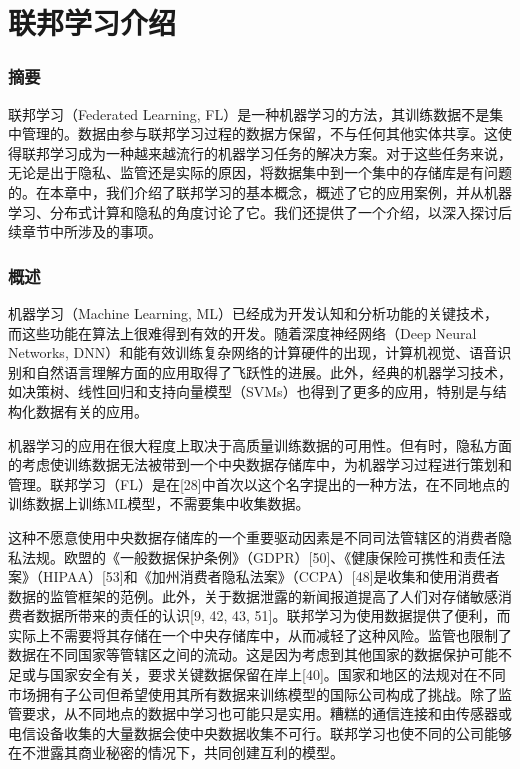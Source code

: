 \chapter{联邦学习介绍}

\subsection{摘要}

联邦学习\cite{mcmahan2017communication}（Federated Learning, FL）是一种机器学习的方法，其训练数据不是集中管理的。数据由参与联邦学习过程的数据方保留，不与任何其他实体共享。这使得联邦学习成为一种越来越流行的机器学习任务的解决方案。对于这些任务来说，无论是出于隐私、监管还是实际的原因，将数据集中到一个集中的存储库是有问题的。在本章中，我们介绍了联邦学习的基本概念，概述了它的应用案例，并从机器学习、分布式计算和隐私的角度讨论了它。我们还提供了一个介绍，以深入探讨后续章节中所涉及的事项。

\subsection{概述}

机器学习（Machine Learning, ML）已经成为开发认知和分析功能的关键技术，而这些功能在算法上很难得到有效的开发。随着深度神经网络（Deep Neural Networks, DNN）和能有效训练复杂网络的计算硬件的出现，计算机视觉、语音识别和自然语言理解方面的应用取得了飞跃性的进展。此外，经典的机器学习技术，如决策树、线性回归和支持向量模型（SVMs）也得到了更多的应用，特别是与结构化数据有关的应用。

机器学习的应用在很大程度上取决于高质量训练数据的可用性。但有时，隐私方面的考虑使训练数据无法被带到一个中央数据存储库中，为机器学习过程进行策划和管理。联邦学习（FL）是在[28]中首次以这个名字提出的一种方法，在不同地点的训练数据上训练ML模型，不需要集中收集数据。

这种不愿意使用中央数据存储库的一个重要驱动因素是不同司法管辖区的消费者隐私法规。欧盟的《一般数据保护条例》（GDPR）[50]、《健康保险可携性和责任法案》（HIPAA）[53]和《加州消费者隐私法案》（CCPA）[48]是收集和使用消费者数据的监管框架的范例。此外，关于数据泄露的新闻报道提高了人们对存储敏感消费者数据所带来的责任的认识[9, 42, 43, 51]。联邦学习为使用数据提供了便利，而实际上不需要将其存储在一个中央存储库中，从而减轻了这种风险。监管也限制了数据在不同国家等管辖区之间的流动。这是因为考虑到其他国家的数据保护可能不足或与国家安全有关，要求关键数据保留在岸上[40]。国家和地区的法规对在不同市场拥有子公司但希望使用其所有数据来训练模型的国际公司构成了挑战。除了监管要求，从不同地点的数据中学习也可能只是实用。糟糕的通信连接和由传感器或电信设备收集的大量数据会使中央数据收集不可行。联邦学习也使不同的公司能够在不泄露其商业秘密的情况下，共同创建互利的模型。

